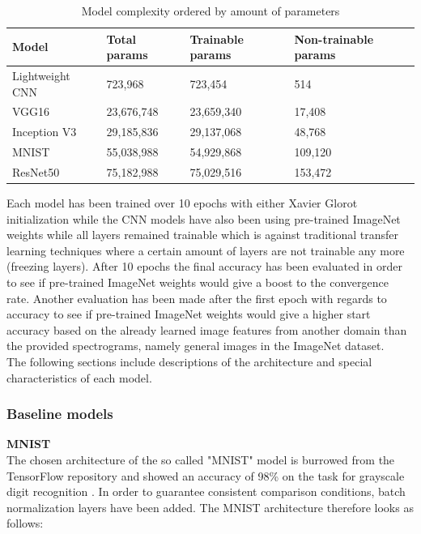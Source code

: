 \documentclass{article}
\theoremstyle{definition}
\theoremstyle{remark}
\begin{document}
\begin{table}[h!]
\center
\begin{tabular}{|l|l|l|l|}
\hline
\textbf{Model} & \textbf{Total params} & \textbf{Trainable params} & \textbf{Non-trainable params} \\ \hline
Lightweight CNN & 723,968 & 723,454 & 514 \\ \hline
VGG16  		& 23,676,748   & 23,659,340        & 17,408 \\ \hline	
Inception V3	& 29,185,836   & 29,137,068  	   & 48,768	 \\ \hline
MNIST			& 55,038,988   & 54,929,868   	   & 109,120  \\ \hline
ResNet50  	& 75,182,988   & 75,029,516 	   & 153,472 \\ \hline	
\end{tabular}
\caption{Model complexity ordered by amount of parameters}
\label{tab:model_complexity}
\end{table}

Each model has been trained over 10 epochs with either Xavier Glorot initialization while the CNN models have also been using pre-trained ImageNet weights while all layers remained trainable which is against traditional transfer learning techniques where a certain amount of layers are not trainable any more (freezing layers). After 10 epochs the final accuracy has been evaluated in order to see if pre-trained ImageNet weights would give a boost to the convergence rate. Another evaluation has been made after the first epoch with regards to accuracy to see if pre-trained ImageNet weights would give a higher start accuracy based on the already learned image features from another domain than the provided spectrograms, namely general images in the ImageNet dataset.\\



The following sections include descriptions of the architecture and special characteristics of each model. 



\subsubsection{Baseline models}


\noindent\textbf{MNIST}\\

The chosen architecture of the so called "MNIST" model is burrowed from the TensorFlow repository \cite{mnist_code} and showed an accuracy of 98\% on the task for grayscale digit recognition \cite{deng2012mnist}. In order to guarantee consistent comparison conditions, batch normalization layers have been added. The MNIST architecture therefore looks as follows:
\end{document}
